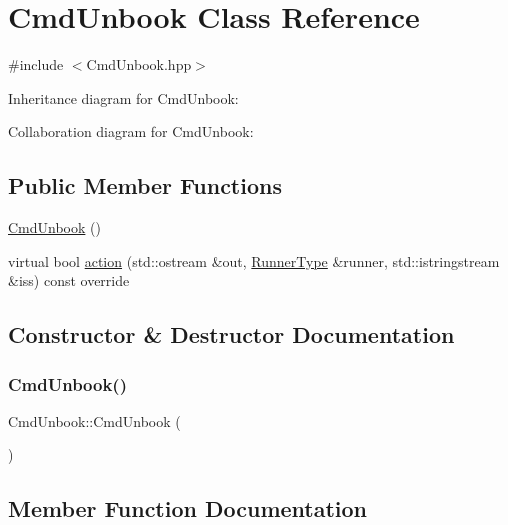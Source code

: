 \hypertarget{classCmdUnbook}{}\section{Cmd\+Unbook Class Reference}
\label{classCmdUnbook}


{\ttfamily \#include $<$Cmd\+Unbook.\+hpp$>$}



Inheritance diagram for Cmd\+Unbook\+:


Collaboration diagram for Cmd\+Unbook\+:
\subsection*{Public Member Functions}
\begin{DoxyCompactItemize}
\item 
\hyperlink{classCmdUnbook_ae5bc9a66b878281e7db66c13e581f6b4}{Cmd\+Unbook} ()
\item 
virtual bool \hyperlink{classCmdUnbook_a1504b0d1183a3ccd2487b3cab4bb5e0d}{action} (std\+::ostream \&out, \hyperlink{Command_8hpp_ad45c3de597c2023a8be0399d914161f4}{Runner\+Type} \&runner, std\+::istringstream \&iss) const override
\end{DoxyCompactItemize}


\subsection{Constructor \& Destructor Documentation}
\mbox{\label{classCmdUnbook_ae5bc9a66b878281e7db66c13e581f6b4}} 
\subsubsection{\texorpdfstring{Cmd\+Unbook()}{CmdUnbook()}}
{\footnotesize\ttfamily Cmd\+Unbook\+::\+Cmd\+Unbook (\begin{DoxyParamCaption}{ }\end{DoxyParamCaption})}



\subsection{Member Function Documentation}
\mbox{\label{classCmdUnbook_a1504b0d1183a3ccd2487b3cab4bb5e0d}} 
